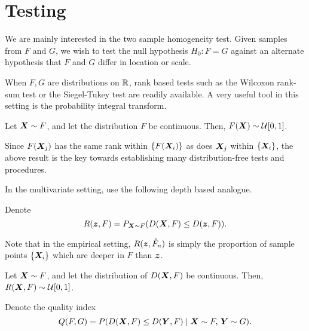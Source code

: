 \section{Testing}
\label{sec:multivariate_testing}

We are mainly interested in the two sample homogeneity test.
Given samples from $F$ and $G$, we wish to test the null hypothesis $H_0: F =
G$ against an alternate hypothesis that $F$ and $G$ differ in location or
scale.

When $F, G$ are distributions on $\mathbb{R}$, rank based tests such as the Wilcoxon
rank-sum test or the Siegel-Tukey test are readily available.
A very useful tool in this setting is the probability integral transform.

\begin{proposition}
    Let $\bm{X} \sim F$, and let the distribution $F$ be continuous.
    Then, $F(\bm{X}) \sim \mathcal{U}[0, 1]$.
\end{proposition}

Since $F(\bm{X}_j)$ has the same rank within $\{F(\bm{X}_i)\}$ as does $\bm{X}_j$
within $\{\bm{X}_i\}$, the above result is the key towards establishing many
distribution-free tests and procedures.


In the multivariate setting, \textcite{liu-singh-1993} use the following depth
based analogue.

\begin{definition}
    Denote
    \begin{equation}
        R(\bm{z}, F) = P_{\bm{X} \sim F}(D(\bm{X}, F) \leq D(\bm{z}, F)).
    \end{equation}
\end{definition}

Note that in the empirical setting, $R(\bm{z}, \hat{F}_n)$ is simply the
proportion of sample points $\{\bm{X}_i\}$ which are deeper in $F$ than $\bm{z}$.


\begin{proposition}
    Let $\bm{X} \sim F$, and let the distribution of $D(\bm{X}, F)$ be continuous.
    Then, $R(\bm{X}, F) \sim \mathcal{U}[0, 1]$.
\end{proposition}


\begin{definition}
    Denote the quality index
    \begin{equation}
        Q(F, G) = P(D(\bm{X}, F) \leq D(\bm{Y}, F) \mid \bm{X} \sim F,\, \bm{Y} \sim G).
    \end{equation}
\end{definition}

